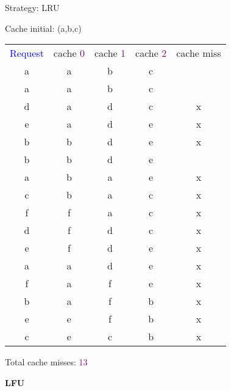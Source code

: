 \begin{tcolorbox}
{
Strategy: LRU

\vspace{\baselineskip}

Cache initial: (a,b,c)

\vspace{\baselineskip}
\begin{tabular}{*{5}{c}}
\textcolor{Blue}{Request} & cache \textcolor{Purple}{0} & cache \textcolor{Purple}{1} & cache \textcolor{Purple}{2} & cache miss \\
a & a & b & c & \ \\
a & a & b & c & \ \\
d & a & d & c & x \\
e & a & d & e & x \\
b & b & d & e & x \\
b & b & d & e & \ \\
a & b & a & e & x \\
c & b & a & c & x \\
f & f & a & c & x \\
d & f & d & c & x \\
e & f & d & e & x \\
a & a & d & e & x \\
f & a & f & e & x \\
b & a & f & b & x \\
e & e & f & b & x \\
c & e & c & b & x \\
\end{tabular}

\vspace{\baselineskip}

Total cache misses: \textcolor{Purple}{13}}
\end{tcolorbox}

\textbf{LFU}

